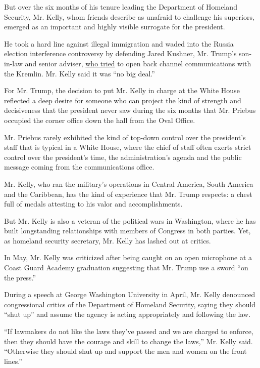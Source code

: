 But over the six months of his tenure leading the Department of Homeland
Security, Mr. Kelly, whom friends describe as unafraid to challenge his
superiors, emerged as an important and highly visible surrogate for the
president.

He took a hard line against illegal immigration and waded into the
Russia election interference controversy by defending Jared Kushner, Mr.
Trump's son-in-law and senior adviser,
\href{https://www.nytimes.com/2017/05/26/us/politics/kushner-talked-to-russian-envoy-about-creating-secret-channel-with-kremlin.html}{who
tried} to open back channel communications with the Kremlin. Mr. Kelly
said it was ``no big deal.''

For Mr. Trump, the decision to put Mr. Kelly in charge at the White
House reflected a deep desire for someone who can project the kind of
strength and decisiveness that the president never saw during the six
months that Mr. Priebus occupied the corner office down the hall from
the Oval Office.

Mr. Priebus rarely exhibited the kind of top-down control over the
president's staff that is typical in a White House, where the chief of
staff often exerts strict control over the president's time, the
administration's agenda and the public message coming from the
communications office.

Mr. Kelly, who ran the military's operations in Central America, South
America and the Caribbean, has the kind of experience that Mr. Trump
respects: a chest full of medals attesting to his valor and
accomplishments.

But Mr. Kelly is also a veteran of the political wars in Washington,
where he has built longstanding relationships with members of Congress
in both parties. Yet, as homeland security secretary, Mr. Kelly has
lashed out at critics.

In May, Mr. Kelly was criticized after being caught on an open
microphone at a Coast Guard Academy graduation suggesting that Mr. Trump
use a sword ``on the press.''

During a speech at George Washington University in April, Mr. Kelly
denounced congressional critics of the Department of Homeland Security,
saying they should ``shut up'' and assume the agency is acting
appropriately and following the law.

``If lawmakers do not like the laws they've passed and we are charged to
enforce, then they should have the courage and skill to change the
laws,'' Mr. Kelly said. ``Otherwise they should shut up and support the
men and women on the front lines.''

